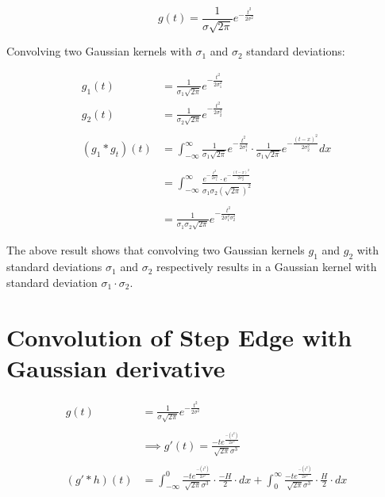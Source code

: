 \documentclass[12pt, oneside]{article}
\begin{document}
$$ g(t) = \frac{1}{\sigma \sqrt{2 \pi}}e^{-\frac{t^2}{2 \sigma ^ 2}} $$

Convolving two Gaussian kernels with $\sigma_1$ and $\sigma_2$ standard
deviations:

\begin{align*}
    g_1(t) &= \frac{1}{\sigma_1 \sqrt{2 \pi}}e^{-\frac{t^2}{2 \sigma_1 ^ 2}}  \\
    g_2(t) &= \frac{1}{\sigma_2 \sqrt{2 \pi}}e^{-\frac{t^2}{2 \sigma_2 ^ 2}}  \\\\
    (g_1 * g_t)(t) &= 
    \int_{-\infty}^{\infty} 
    \frac{1}{\sigma_1 \sqrt{2 \pi}}e^{-\frac{t^2}{2 \sigma_1 ^ 2}} 
    \cdot
    \frac{1}{\sigma_1 \sqrt{2 \pi}}e^{-\frac{(t-x)^2}{2 \sigma_2 ^ 2}} dx  \\\\
    &= \int_{-\infty}^{\infty} 
    \frac{  e^{-\frac{t^2}{2 \sigma_1 ^ 2}} \cdot 
            e^{-\frac{(t-x)^2}{2 \sigma_2 ^ 2}}}{ 
                \sigma_1 \sigma_2 (\sqrt{2 \pi})^2}    \\\\
    &= \frac{1}{\sigma_1 \sigma_2 \sqrt{2 \pi}}
    e^{-\frac{t^2}{2 \sigma_1 ^ 2 \sigma_2 ^ 2 }} 
\end{align*}

The above result shows that convolving two Gaussian kernels $g_1$ and $g_2$
with standard deviations $\sigma_1$ and $\sigma_2$ respectively results in
a Gaussian kernel with standard deviation $\sigma_1 \cdot \sigma_2$.

\section{Convolution of Step Edge with Gaussian derivative}

\begin{align*}
    g(t) &= \frac{1}{\sigma \sqrt{2 \pi}}e^{-\frac{t^2}{2 \sigma ^ 2}}  \\\\
    &\implies g'(t) =  \frac{-t e^{\frac{-(t ^ 2)}{2 \sigma ^ 2}} }{ 
    \sqrt{2 \pi} \sigma ^ 3} \\\\
    (g' * h)(t) &= 
    \int_{-\infty}^{0} 
    \frac{-t e^{\frac{-(t ^ 2)}{2 \sigma ^ 2}} }{ 
    \sqrt{2 \pi} \sigma ^ 3}
    \cdot
    \frac{-H}{2} \cdot dx  +
    \int_{0}^{\infty} 
    \frac{-t e^{\frac{-(t ^ 2)}{2 \sigma ^ 2}} }{ 
    \sqrt{2 \pi} \sigma ^ 3}
    \cdot
    \frac{H}{2} \cdot dx  
\end{align*}
\end{document}
